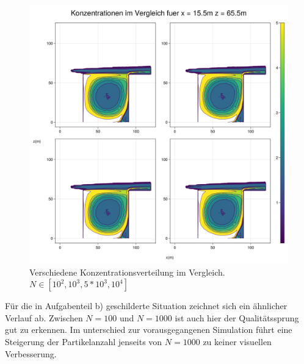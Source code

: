 \documentclass[ngerman]{scrartcl}
\begin{document}
\begin{figure}[H]
	\centering
	\includegraphics[scale=0.3]{Bilder/3_vergleich_x = 15.5.png}
	\caption{ Verschiedene Konzentrationsverteilung im Vergleich. $N \in[10^2,10^3,5 *10^3,10^4]$}
	\label{fig:my_label}
\end{figure}
Für die in Aufgabenteil b) geschilderte Situation zeichnet sich ein ähnlicher Verlauf ab. Zwischen $N=100$ und $N=1000$ ist auch hier der Qualitätssprung gut zu erkennen. Im unterschied zur vorausgegangenen Simulation führt eine Steigerung der Partikelanzahl jenseits von $N=1000$ zu keiner visuellen Verbesserung.
\end{document}
